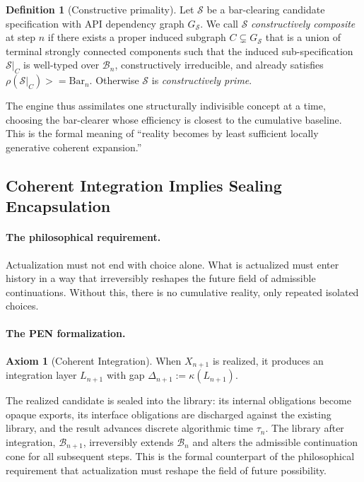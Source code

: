 \documentclass[11pt,a4paper]{article}
\def\geq{>=}%
\theoremstyle{plain}
\theoremstyle{definition}
\newtheorem{definition}[theorem]{Definition}
\newtheorem{axiom}[theorem]{Axiom}
\theoremstyle{remark}
\newcommand{\B}{\mathcal{B}}
\begin{document}
\begin{definition}[Constructive primality]
\label{def:primality}
Let $\mathcal{S}$ be a bar-clearing candidate specification with API dependency graph $G_{\mathcal{S}}$.  We call $\mathcal{S}$ \emph{constructively composite} at step $n$ if there exists a proper induced subgraph $C \subsetneq G_{\mathcal{S}}$ that is a union of terminal strongly connected components such that the induced sub-specification $\mathcal{S}|_C$ is well-typed over $\B_n$, constructively irreducible, and already satisfies $\rho(\mathcal{S}|_C) \geq \mathrm{Bar}_n$.  Otherwise $\mathcal{S}$ is \emph{constructively prime}.
\end{definition}

The engine thus assimilates one structurally indivisible concept at a time, choosing the bar-clearer whose efficiency is closest to the cumulative baseline.  This is the formal meaning of ``reality becomes by least sufficient locally generative coherent expansion.''


\subsection{Coherent Integration Implies Sealing Encapsulation}
\label{sec:integration}

\paragraph{The philosophical requirement.}
Actualization must not end with choice alone.  What is actualized must enter history in a way that irreversibly reshapes the future field of admissible continuations.  Without this, there is no cumulative reality, only repeated isolated choices.

\paragraph{The PEN formalization.}
\begin{axiom}[Coherent Integration]
\label{ax:integration}
When $X_{n+1}$ is realized, it produces an integration layer $L_{n+1}$ with gap $\Delta_{n+1} := \kappa(L_{n+1})$.
\end{axiom}

The realized candidate is sealed into the library: its internal obligations become opaque exports, its interface obligations are discharged against the existing library, and the result advances discrete algorithmic time $\tau_n$.  The library after integration, $\B_{n+1}$, irreversibly extends $\B_n$ and alters the admissible continuation cone for all subsequent steps.  This is the formal counterpart of the philosophical requirement that actualization must reshape the field of future possibility.
\end{document}
